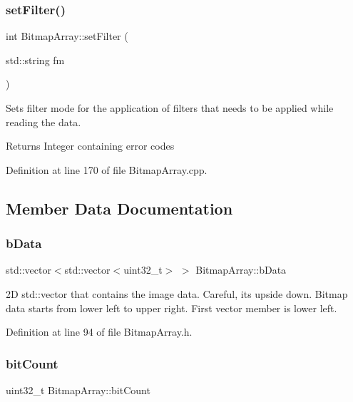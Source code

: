 \subsubsection{\texorpdfstring{setFilter()}{setFilter()}}
{\footnotesize\ttfamily int Bitmap\+Array\+::set\+Filter (\begin{DoxyParamCaption}\item[{std\+::string}]{fm }\end{DoxyParamCaption})}



Sets filter mode for the application of filters that needs to be applied while reading the data. 

\begin{DoxyReturn}{Returns}
Integer containing error codes 
\end{DoxyReturn}


Definition at line 170 of file Bitmap\+Array.\+cpp.



\subsection{Member Data Documentation}
\mbox{\label{classBitmapArray_a4af158b9be17ce7ebeab8729c2b34ab2}} 
\subsubsection{\texorpdfstring{bData}{bData}}
{\footnotesize\ttfamily std\+::vector$<$std\+::vector$<$uint32\+\_\+t$>$ $>$ Bitmap\+Array\+::b\+Data\hspace{0.3cm}{\ttfamily [private]}}

2D std\+::vector that contains the image data. Careful, its upside down. Bitmap data starts from lower left to upper right. First vector member is lower left. 

Definition at line 94 of file Bitmap\+Array.\+h.

\mbox{\label{classBitmapArray_a18127e27d4b1477fd46ef0c0b3dbc110}} 
\subsubsection{\texorpdfstring{bitCount}{bitCount}}
{\footnotesize\ttfamily uint32\+\_\+t Bitmap\+Array\+::bit\+Count\hspace{0.3cm}{\ttfamily [private]}}

